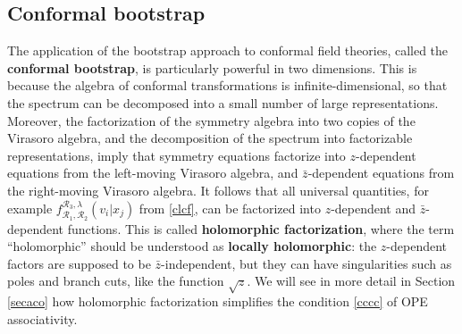 \documentclass[12pt, a4paper, notitlepage, twoside]{report}
\numberwithin{equation}{section}
\theoremstyle{break}
\begin{document}
\subsection{Conformal bootstrap}

The application of the bootstrap approach to conformal field theories, called the \textbf{conformal bootstrap}, 
is particularly powerful in two dimensions.
This is because the algebra of conformal transformations is infinite-dimensional, 
so that the spectrum can be decomposed into a small number of large representations.
Moreover, the factorization of the symmetry algebra into two copies of the Virasoro algebra, and the decomposition of the spectrum into factorizable representations,
imply that symmetry equations factorize into $z$-dependent equations from the left-moving Virasoro algebra, and $\bar{z}$-dependent equations from the right-moving Virasoro algebra.
It follows that all universal quantities, for example $f_{\mathcal{R}_1,\mathcal{R}_2}^{\mathcal{R}_3,\lambda}(v_i|x_j)$ from \eqref{clcf}, can be factorized into $z$-dependent and $\bar{z}$-dependent functions. 
This is called \textbf{\boldmath holomorphic factorization}, where the term ``holomorphic''
should be understood as \textbf{\boldmath locally holomorphic}: the $z$-dependent factors are supposed to be $\bar{z}$-independent, but they can have singularities such as poles and branch cuts, like the function $\sqrt{z}$.
We will see in more detail in Section \ref{secaco} how holomorphic factorization simplifies the condition \eqref{cccc} of OPE associativity.
\end{document}

